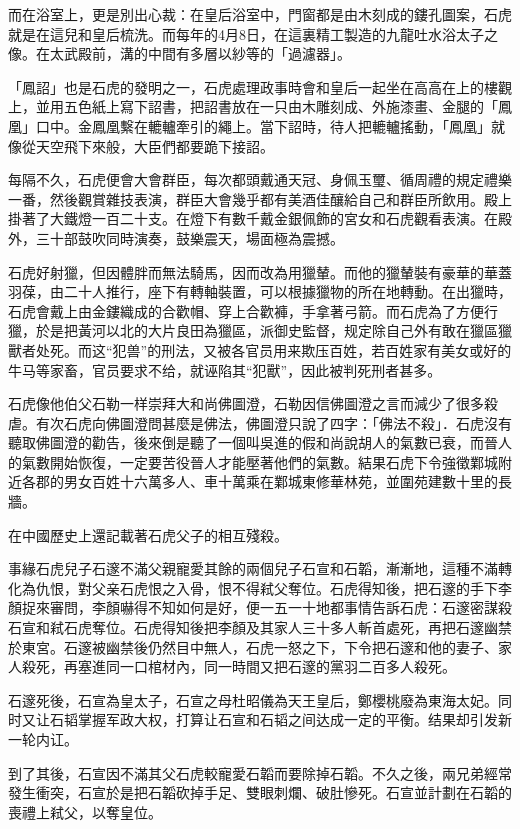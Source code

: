 而在浴室上，更是別出心裁：在皇后浴室中，門窗都是由木刻成的鏤孔圖案，石虎就是在這兒和皇后梳洗。而每年的4月8日，在這裏精工製造的九龍吐水浴太子之像。在太武殿前，溝的中間有多層以紗等的「過濾器」。

「鳳詔」也是石虎的發明之一，石虎處理政事時會和皇后一起坐在高高在上的樓觀上，並用五色紙上寫下詔書，把詔書放在一只由木雕刻成、外施漆畫、金腿的「鳳凰」口中。金鳳凰繫在轆轤牽引的繩上。當下詔時，待人把轆轤搖動，「鳳凰」就像從天空飛下來般，大臣們都要跪下接詔。

每隔不久，石虎便會大會群臣，每次都頭戴通天冠、身佩玉璽、循周禮的規定禮樂一番，然後觀賞雜技表演，群臣大會幾乎都有美酒佳釀給自己和群臣所飲用。殿上掛著了大鐵燈一百二十支。在燈下有數千戴金銀佩飾的宮女和石虎觀看表演。在殿外，三十部鼓吹同時演奏，鼓樂震天，場面極為震撼。

石虎好射獵，但因體胖而無法騎馬，因而改為用獵輦。而他的獵輦裝有豪華的華蓋羽葆，由二十人推行，座下有轉軸裝置，可以根據獵物的所在地轉動。在出獵時，石虎會戴上由金鏤織成的合歡帽、穿上合歡褲，手拿著弓箭。而石虎為了方便行獵，於是把黃河以北的大片良田為獵區，派御史監督，规定除自己外有敢在獵區獵獸者处死。而这“犯兽”的刑法，又被各官员用来欺压百姓，若百姓家有美女或好的牛马等家畜，官员要求不给，就诬陷其“犯獸”，因此被判死刑者甚多。

石虎像他伯父石勒一样崇拜大和尚佛圖澄，石勒因信佛圖澄之言而減少了很多殺虐。有次石虎向佛圖澄問甚麼是佛法，佛圖澄只說了四字：「佛法不殺」．石虎沒有聽取佛圖澄的勸告，後來倒是聽了一個叫吳進的假和尚說胡人的氣數已衰，而晉人的氣數開始恢復，一定要苦役晉人才能壓著他們的氣數。結果石虎下令強徵鄴城附近各郡的男女百姓十六萬多人、車十萬乘在鄴城東修華林苑，並圍苑建數十里的長牆。

在中國歷史上還記載著石虎父子的相互殘殺。

事緣石虎兒子石邃不滿父親寵愛其餘的兩個兒子石宣和石韜，漸漸地，這種不滿轉化為仇恨，對父亲石虎恨之入骨，恨不得弒父奪位。石虎得知後，把石邃的手下李顏捉來審問，李顏嚇得不知如何是好，便一五一十地都事情告訴石虎：石邃密謀殺石宣和弒石虎奪位。石虎得知後把李顏及其家人三十多人斬首處死，再把石邃幽禁於東宮。石邃被幽禁後仍然目中無人，石虎一怒之下，下令把石邃和他的妻子、家人殺死，再塞進同一口棺材內，同一時間又把石邃的黨羽二百多人殺死。

石邃死後，石宣為皇太子，石宣之母杜昭儀為天王皇后，鄭櫻桃廢為東海太妃。同时又让石韬掌握军政大权，打算让石宣和石韬之间达成一定的平衡。结果却引发新一轮内讧。

到了其後，石宣因不滿其父石虎較寵愛石韜而要除掉石韜。不久之後，兩兄弟經常發生衝突，石宣於是把石韜砍掉手足、雙眼刺爛、破肚慘死。石宣並計劃在石韜的喪禮上弒父，以奪皇位。

